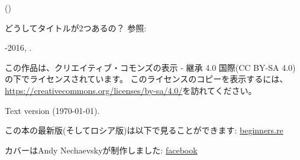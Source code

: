 ﻿\begin{titlepage}


\end{titlepage}

\newpage

\begin{center}
\vspace*{\fill}
{\LARGE \TitleMain}

\bigskip

{\large (\TitleAux)}

\bigskip
\bigskip
どうしてタイトルが2つあるの？ 参照: 

\vspace*{\fill}

{\large \AUTHOR}

{\large \TT{<\EMAIL>}}
\vspace*{\fill}
\vfill

\ccbysa

-2016, \AUTHOR. 

この作品は、クリエイティブ・コモンズの表示 - 継承 4.0 国際(CC BY-SA 4.0)の下でライセンスされています。
このライセンスのコピーを表示するには、\url{https://creativecommons.org/licenses/by-sa/4.0/}を訪れてください。

Text version ({\large \today}).

この本の最新版(そしてロシア版)は以下で見ることができます: \href{http://go.yurichev.com/17009}{beginners.re}

カバーはAndy Nechaevskyが制作しました: \href{http://go.yurichev.com/17023}{facebook}

\end{center}
